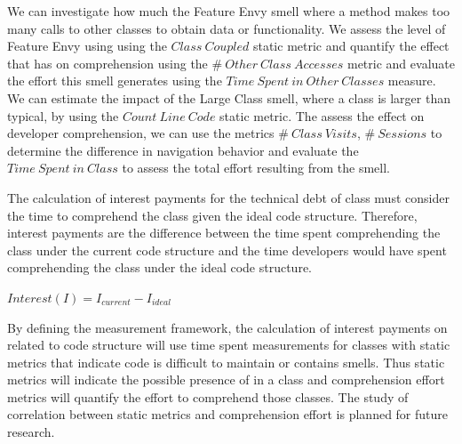 We can investigate how much the Feature Envy smell  where a method makes too many calls to other classes to obtain data or functionality.  We assess the level of Feature Envy using using the $Class~Coupled$ static metric and quantify the effect that has on comprehension using the $\#~Other~Class~Accesses$ metric and evaluate the effort this smell generates using the $Time~Spent~in~Other~Classes$ measure.  
We can estimate the impact of the Large Class smell, where a class is larger than typical, by using the $Count~Line~Code$ static metric.  The assess the effect on developer comprehension, we can use the metrics $\#~Class~Visits$, $\#~Sessions$ to determine the difference in navigation behavior and evaluate the $Time~Spent~in~Class$ to assess the total effort resulting from the smell.


The calculation of interest payments for the technical debt of class must consider the time to comprehend the class given the ideal code structure.  Therefore, interest payments are the difference between the time spent comprehending the class under the current code structure and the time developers would have spent comprehending the class under the ideal code structure.

$ Interest(I) = I_{current} - I_{ideal} $

By defining the measurement framework, the calculation of interest payments on \TD related to code structure will use time spent measurements for classes with static metrics that indicate code is difficult to maintain or contains smells.  Thus static metrics will indicate the possible presence of \TD in a class and comprehension effort metrics will quantify the effort to comprehend those classes. The study of correlation between static metrics and comprehension effort is planned for future research.



